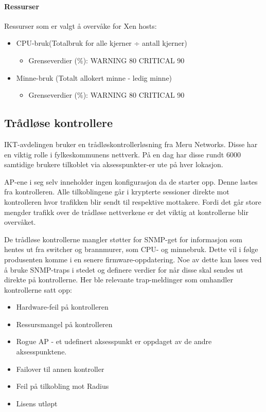 \paragraph{Ressurser}
Ressurser som er valgt å overvåke for Xen hosts:

\begin{itemize}
        \item CPU-bruk(Totalbruk for alle kjerner ÷ antall kjerner)
        \begin{itemize}
                \item Grenseverdier (\%): WARNING 80 CRITICAL 90
        \end{itemize}
        \item Minne-bruk (Totalt allokert minne - ledig minne)
        \begin{itemize}
                \item Grenseverdier (\%): WARNING 80 CRITICAL 90
        \end{itemize}
\end{itemize}

\subsection{Trådløse kontrollere}
IKT-avdelingen bruker en trådløskontrollerløsning fra Meru Networks. Disse har en viktig rolle i fylkeskommunens nettverk. På en dag har disse rundt 6000 samtidige brukere tilkoblet via aksesspunkter-er ute på hver lokasjon.

AP-ene i seg selv inneholder ingen konfigurasjon da de starter opp. Denne lastes fra kontrolleren. Alle tilkoblingene går i krypterte sessioner direkte mot kontrolleren hvor trafikken blir sendt til respektive mottakere. Fordi det går store mengder trafikk over de trådløse nettverkene er det viktig at kontrollerne blir overvåket.

De trådløse kontrollerne mangler støtter for SNMP-get for informasjon som hentes ut fra switcher og brannmurer, som CPU- og minnebruk. Dette vil i følge produsenten komme i en senere firmware-oppdatering. Noe av dette kan løses ved å bruke SNMP-traps i stedet og definere verdier for når disse skal sendes ut direkte på kontrollerne. Her ble relevante trap-meldinger som omhandler kontrollerne satt opp:
\begin{itemize}
	\item Hardware-feil på kontrolleren
	\item Ressursmangel på kontrolleren
	\item Rogue AP - et udefinert aksesspunkt er oppdaget av de andre aksesspunktene.
	\item Failover til annen kontroller
	\item Feil på tilkobling mot Radius
	\item Lisens utløpt
\end{itemize}

